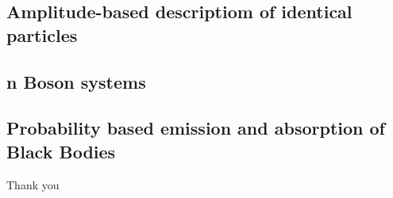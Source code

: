 \documentclass[aspectratio=169]{beamer}
\begin{document}
\subsection{Amplitude-based descriptiom of identical particles}

\subsection{n Boson systems}

\subsection{Probability based emission and absorption of Black Bodies}

\begin{frame}{}
	\begin{center}
{\Large Thank you}
	\end{center}
\end{frame}
\end{document}
